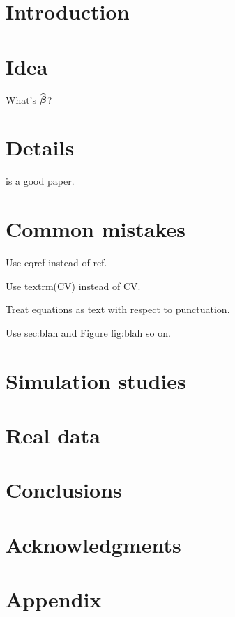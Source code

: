 \section{Introduction}

\section{Idea}

What's $\widehat{\boldsymbol{\beta}}$?

\as{\y = \X\bb + \bvep}

\section{Details}

\citet{Tibshirani1996} is a good paper.

\section{Common mistakes}

Use eqref instead of ref.

Use textrm(CV) instead of CV.

Treat equations as text with respect to punctuation.

Use sec:blah and Figure fig:blah so on.

\section{Simulation studies}
\label{Sec:sim}



\section{Real data}

\section{Conclusions}

\section*{Acknowledgments}

\section*{Appendix}
